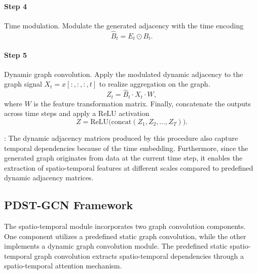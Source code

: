 \documentclass[preprint,12pt,authoryear]{elsarticle}
\begin{document}
\paragraph{Step 4} Time modulation. Modulate the generated adjacency with the time encoding
\begin{equation}
\hat{B}_t = E_t \odot B_t.
\end{equation}

\paragraph{Step 5} Dynamic graph convolution. Apply the modulated dynamic adjacency to the graph signal $X_t = x[:,:,:,t]$ to realize aggregation on the graph.
\begin{equation}
Z_t = \hat{B}_t \cdot X_t \cdot W,
\end{equation}
where $W$ is the feature transformation matrix. Finally, concatenate the outputs across time steps and apply a ReLU activation
\begin{equation}
Z = \mathrm{ReLU}\bigl(\mathrm{concat}(Z_1, Z_2, \dots, Z_T)\bigr).
\end{equation}

: The dynamic adjacency matrices produced by this procedure also capture temporal dependencies because of the time embedding. Furthermore, since the generated graph originates from data at the current time step, it enables the extraction of spatio-temporal features at different scales compared to predefined dynamic adjacency matrices.

\subsection{PDST-GCN Framework}

The spatio-temporal module incorporates two graph convolution components. One component utilizes a predefined static graph convolution, while the other implements a dynamic graph convolution module. The predefined static spatio-temporal graph convolution extracts spatio-temporal dependencies through a spatio-temporal attention mechanism. 
\end{document}
